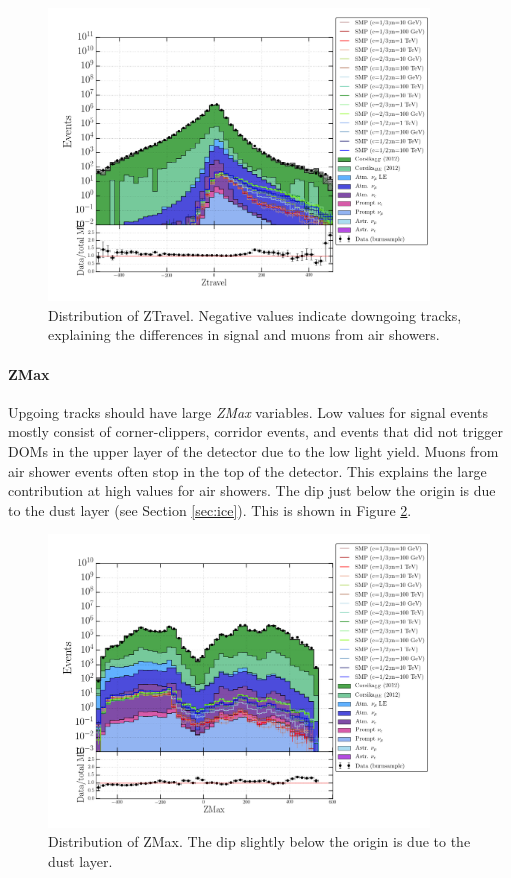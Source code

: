 \begin{figure}
\centering
\includegraphics[width = 0.9\textwidth]{chapter8/img/1D_stack_ztravel.png}
\caption{Distribution of ZTravel. Negative values indicate downgoing tracks, explaining the differences in signal and muons from air showers.}
\label{fig:commonvariablesztravel}
\end{figure}

\paragraph{ZMax}
Upgoing tracks should have large \textit{ZMax} variables. Low values for signal events mostly consist of corner-clippers, corridor events, and events that did not trigger DOMs in the upper layer of the detector due to the low light yield. Muons from air shower events often stop in the top of the detector. This explains the large contribution at high values for air showers. The dip just below the origin is due to the dust layer (see Section \ref{sec:ice}). This is shown in Figure \ref{fig:commonvariableszmax}.

\begin{figure}
\centering
\includegraphics[width = 0.9\textwidth]{chapter8/img/1D_stack_zmax.png}
\caption{Distribution of ZMax. The dip slightly below the origin is due to the dust layer.}
\label{fig:commonvariableszmax}
\end{figure}

